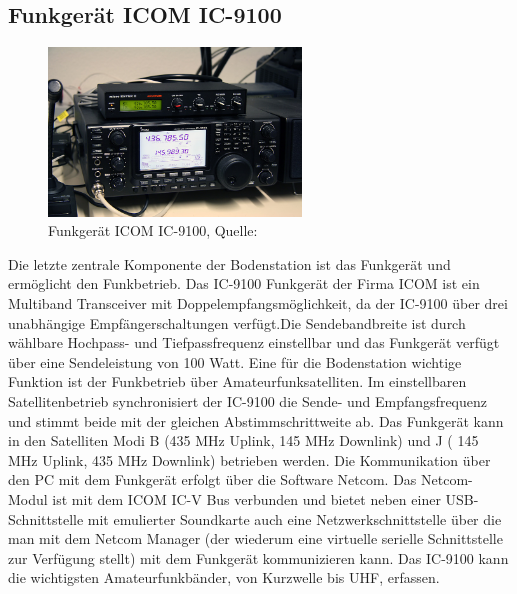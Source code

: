 \subsection{Funkgerät ICOM IC-9100}
\label{chap:funkgerät}
\begin{figure}[h]
	\centering
	\includegraphics[width=0.6\textwidth]{images/radio}
	\caption[Funkgerät ICOM IC-9100]{Funkgerät ICOM IC-9100, Quelle: \cite{dk0te}}
	\label{fig:radio}
\end{figure}
Die letzte zentrale Komponente der Bodenstation ist das Funkgerät und ermöglicht den Funkbetrieb. Das IC-9100 Funkgerät der Firma ICOM ist ein 
Multiband Transceiver mit Doppelempfangsmöglichkeit, da der IC-9100 über drei unabhängige Empfängerschaltungen verfügt.Die Sendebandbreite ist durch 
wählbare Hochpass- und Tiefpassfrequenz einstellbar und das Funkgerät verfügt über eine Sendeleistung von 100 Watt. Eine für die Bodenstation 
wichtige Funktion ist der Funkbetrieb über Amateurfunksatelliten. Im einstellbaren Satellitenbetrieb synchronisiert der IC-9100 die Sende-  und 
Empfangsfrequenz und stimmt beide mit der gleichen Abstimmschrittweite ab. Das Funkgerät kann in den Satelliten Modi B (435 MHz Uplink, 145 MHz 
Downlink) und J ( 145 MHz Uplink, 435 MHz Downlink) betrieben werden. Die Kommunikation über den PC mit dem Funkgerät erfolgt über die Software 
Netcom.  Das Netcom-Modul ist mit dem ICOM IC-V Bus verbunden und bietet neben einer USB-Schnittstelle mit emulierter 
Soundkarte auch eine Netzwerkschnittstelle über die man mit dem Netcom Manager (der wiederum eine virtuelle serielle Schnittstelle zur Verfügung 
stellt) mit dem Funkgerät kommunizieren kann. Das IC-9100 kann die wichtigsten Amateurfunkbänder, von Kurzwelle bis \ac{UHF}, 
erfassen. 





